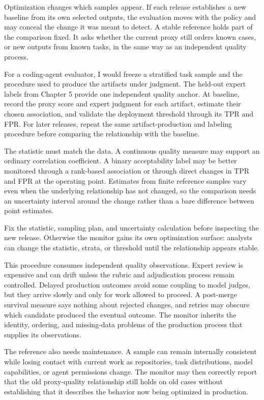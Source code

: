 Optimization changes which samples appear. If each release establishes a new baseline from its own selected outputs, the evaluation moves with the policy and may conceal the change it was meant to detect. A stable reference holds part of the comparison fixed. It asks whether the current proxy still orders known cases, or new outputs from known tasks, in the same way as an independent quality process.

For a coding-agent evaluator, I would freeze a stratified task sample and the procedure used to produce the artifacts under judgment. The held-out expert labels from Chapter 5 provide one independent quality anchor. At baseline, record the proxy score and expert judgment for each artifact, estimate their chosen association, and validate the deployment threshold through its TPR and FPR. For later releases, repeat the same artifact-production and labeling procedure before comparing the relationship with the baseline.

The statistic must match the data. A continuous quality measure may support an ordinary correlation coefficient. A binary acceptability label may be better monitored through a rank-based association or through direct changes in TPR and FPR at the operating point. Estimates from finite reference samples vary even when the underlying relationship has not changed, so the comparison needs an uncertainty interval around the change rather than a bare difference between point estimates.

Fix the statistic, sampling plan, and uncertainty calculation before inspecting the new release. Otherwise the monitor gains its own optimization surface: analysts can change the statistic, strata, or threshold until the relationship appears stable.

This procedure consumes independent quality observations. Expert review is expensive and can drift unless the rubric and adjudication process remain controlled. Delayed production outcomes avoid some coupling to model judges, but they arrive slowly and only for work allowed to proceed. A post-merge survival measure says nothing about rejected changes, and retries may obscure which candidate produced the eventual outcome. The monitor inherits the identity, ordering, and missing-data problems of the production process that supplies its observations.

The reference also needs maintenance. A sample can remain internally consistent while losing contact with current work as repositories, task distributions, model capabilities, or agent permissions change. The monitor may then correctly report that the old proxy-quality relationship still holds on old cases without establishing that it describes the behavior now being optimized in production.

